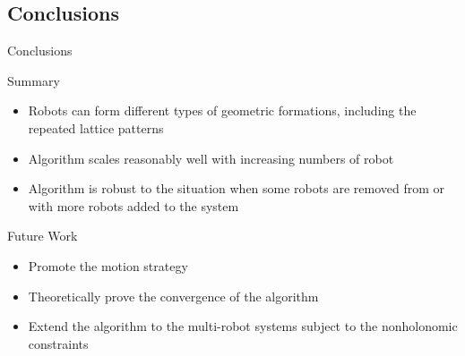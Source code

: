 \documentclass[10pt]{beamer}
\begin{document}
\subsection{Conclusions}
\begin{frame}{Conclusions}{}
\begin{block}{Summary}
  \begin{itemize}
  \item Robots can form different types of geometric formations,
    including the repeated lattice patterns
  \item Algorithm scales reasonably well with increasing numbers of
    robot
  \item Algorithm is robust to the situation when some robots are removed from or
    with more robots added to the system
  \end{itemize}
\end{block}
\begin{block}{Future Work}
  \begin{itemize}
  \item Promote the motion strategy
  \item Theoretically prove the convergence of the algorithm 
  \item Extend the algorithm to the multi-robot systems subject to the nonholonomic
    constraints
  \end{itemize}
\end{block}
\end{frame}


\end{document}
